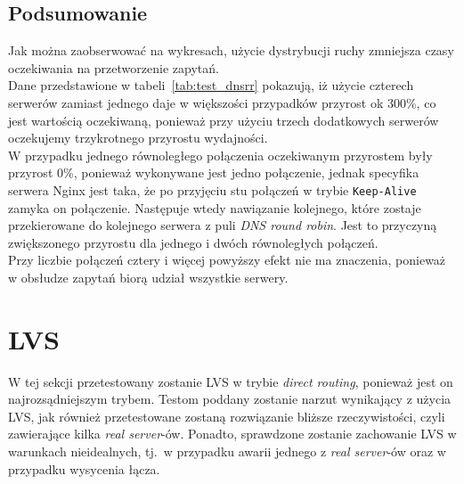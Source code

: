 \subsection{Podsumowanie}
Jak można zaobserwować na wykresach, użycie dystrybucji ruchy zmniejsza czasy oczekiwania na przetworzenie zapytań.\\
Dane przedstawione w tabeli~\ref{tab:test_dnsrr} pokazują, iż użycie czterech serwerów zamiast jednego daje w większości przypadków przyrost ok 300\%, co jest wartością oczekiwaną, ponieważ przy użyciu trzech dodatkowych serwerów oczekujemy trzykrotnego przyrostu wydajności.\\
W przypadku jednego równoległego połączenia oczekiwanym przyrostem były przyrost 0\%, ponieważ wykonywane jest jedno połączenie, jednak specyfika serwera Nginx jest taka, że po przyjęciu stu połączeń w trybie \texttt{Keep-Alive} zamyka on połączenie.
Następuje wtedy nawiązanie kolejnego, które zostaje przekierowane do kolejnego serwera z puli \textit{DNS round robin}.
Jest to przyczyną zwiększonego przyrostu dla jednego i dwóch równoległych połączeń.\\
Przy liczbie połączeń cztery i więcej powyższy efekt nie ma znaczenia, ponieważ w obsłudze zapytań biorą udział wszystkie serwery.
\section{LVS}
W tej sekcji przetestowany zostanie LVS w trybie \textit{direct routing}, ponieważ jest on najrozsądniejszym trybem.
Testom poddany zostanie narzut wynikający z użycia LVS, jak również przetestowane zostaną rozwiązanie bliższe rzeczywistości, czyli zawierające kilka \textit{real server}-ów.
Ponadto, sprawdzone zostanie zachowanie LVS w warunkach nieidealnych, tj.\ w przypadku awarii jednego z \textit{real server}-ów oraz w przypadku wysycenia łącza.
